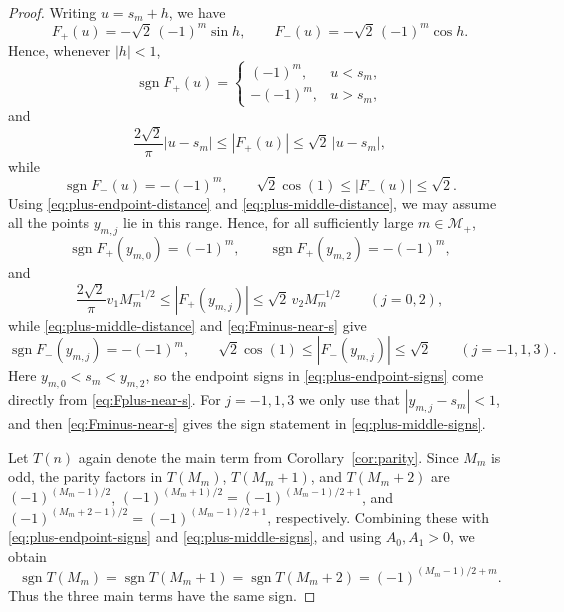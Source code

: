 \documentclass[reqno]{amsart}
\theoremstyle{definition}
\theoremstyle{plain}
\theoremstyle{remark}
\numberwithin{equation}{section}
\newcommand{\sgn}{\operatorname{sgn}}
\begin{document}
\begin{proof}
Writing $u=s_m+h$, we have
\[
  F_+(u)=-\sqrt 2\,(-1)^m\sin h,
  \qquad
  F_-(u)=-\sqrt 2\,(-1)^m\cos h.
\]
Hence, whenever $|h|<1$,
\begin{equation}\label{eq:Fplus-near-s}
  \sgn F_+(u)=
  \begin{cases}
    (-1)^m,& u<s_m,\\
    -(-1)^m,& u>s_m,
  \end{cases}
\end{equation}
and
\begin{equation}\label{eq:Fplus-linear}
  \frac{2\sqrt 2}{\pi}|u-s_m|\le |F_+(u)|\le \sqrt 2\,|u-s_m|,
\end{equation}
while
\begin{equation}\label{eq:Fminus-near-s}
  \sgn F_-(u)=-(-1)^m,
  \qquad
  \sqrt 2\cos(1)\le |F_-(u)|\le \sqrt 2.
\end{equation}
Using \eqref{eq:plus-endpoint-distance} and \eqref{eq:plus-middle-distance}, we may assume all the points $y_{m,j}$ lie in this range. Hence, for all sufficiently large $m\in\mathcal M_+$,
\begin{equation}\label{eq:plus-endpoint-signs}
  \sgn F_+(y_{m,0})=(-1)^m,
  \qquad
  \sgn F_+(y_{m,2})=-(-1)^m,
\end{equation}
and
\begin{equation}\label{eq:plus-endpoint-sizes}
  \frac{2\sqrt 2}{\pi}v_1M_m^{-1/2}\le |F_+(y_{m,j})|\le \sqrt 2\,v_2M_m^{-1/2}
  \qquad (j=0,2),
\end{equation}
while \eqref{eq:plus-middle-distance} and \eqref{eq:Fminus-near-s} give
\begin{equation}\label{eq:plus-middle-signs}
  \sgn F_-(y_{m,j})=-(-1)^m,
  \qquad
  \sqrt 2\cos(1)\le |F_-(y_{m,j})|\le \sqrt 2
  \qquad (j=-1,1,3).
\end{equation}
Here $y_{m,0}<s_m<y_{m,2}$, so the endpoint signs in \eqref{eq:plus-endpoint-signs} come directly from \eqref{eq:Fplus-near-s}. For $j=-1,1,3$ we only use that $|y_{m,j}-s_m|<1$, and then \eqref{eq:Fminus-near-s} gives the sign statement in \eqref{eq:plus-middle-signs}.

Let $T(n)$ again denote the main term from Corollary~\ref{cor:parity}. Since $M_m$ is odd, the parity factors in $T(M_m)$, $T(M_m+1)$, and $T(M_m+2)$ are $(-1)^{(M_m-1)/2}$, $(-1)^{(M_m+1)/2}=(-1)^{(M_m-1)/2+1}$, and $(-1)^{(M_m+2-1)/2}=(-1)^{(M_m-1)/2+1}$, respectively. Combining these with \eqref{eq:plus-endpoint-signs} and \eqref{eq:plus-middle-signs}, and using $A_0,A_1>0$, we obtain
\[
  \sgn T(M_m)=\sgn T(M_m+1)=\sgn T(M_m+2)=(-1)^{(M_m-1)/2+m}.
\]
Thus the three main terms have the same sign.


\end{proof}
\end{document}
